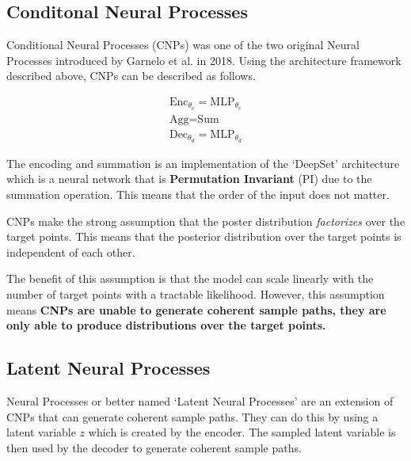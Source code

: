 \documentclass[main.tex]{subfiles}
\begin{document}
\subsection{Conditonal Neural Processes}

Conditional Neural Processes (CNPs) \cite{garnelo2018conditional} was one of the two original Neural Processes introduced by Garnelo et al. in 2018. Using the architecture framework described above, CNPs can be described as follows.

\begin{align*}
    \text{Enc}_{\theta_e} = \text{MLP}_{\theta_e} \\
    \text{Agg} = \text{Sum} \\
    \text{Dec}_{\theta_d}  = \text{MLP}_{\theta_d} 
\end{align*}

The encoding and summation is an implementation of the `DeepSet' architecture \cite{zaheer2018deep} which is a neural network that is \textbf{Permutation Invariant} (PI) due to the summation operation. This means that the order of the input does not matter. 


CNPs make the strong assumption that the poster distribution \emph{factorizes} over the target points. This means that the posterior distribution over the target points is independent of each other. 


The benefit of this assumption is that the model can scale linearly with the number of target points with a tractable likelihood. However, this assumption means
\textbf{CNPs are unable to generate coherent sample paths, they are only able to produce distributions over the target points.}

\subsection{Latent Neural Processes}

Neural Processes or better named `Latent Neural Processes' are an extension of CNPs that can generate coherent sample paths. They can do this by using a latent variable $z$ which is created by the encoder. The sampled latent variable is then used by the decoder to generate coherent sample paths.


\ifSubfilesClassLoaded{%
    \printbibliography{}
}{} 
\end{document}
